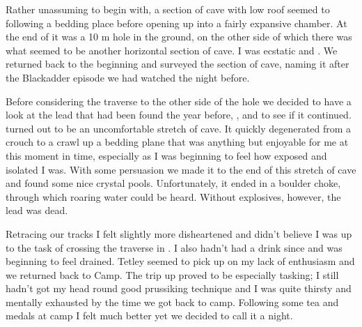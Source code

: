 
Rather unassuming to begin with, a section of cave with low roof seemed
to following a bedding place before opening up into a fairly expansive
chamber. At the end of it was a 10 m hole in the ground, on the other
side of which there was what seemed to be another horizontal section of
cave. I was ecstatic and . We returned
back to the beginning and surveyed the section of cave, naming it  after the Blackadder episode we had watched the night
before.

Before considering the traverse to the other side of the hole we decided
to have a look at the lead that had been found the year before,
, and to see if it continued.  turned out
to be an uncomfortable stretch of cave. It quickly degenerated from a
crouch to a crawl up a bedding plane that was anything but enjoyable for
me at this moment in time, especially as I was beginning to feel how
exposed and isolated I was. With some persuasion we made it to the end
of this stretch of cave and found some nice crystal pools.
Unfortunately, it ended in a boulder choke, through which roaring water
could be heard. Without explosives, however, the lead was dead.

Retracing our tracks I felt slightly more disheartened and didn't
believe I was up to the task of crossing the traverse in . I also hadn't had a drink since  and was beginning
to feel drained. Tetley seemed to pick up on my lack of enthusiasm and
we returned back to Camp. The trip up  proved to be
especially tasking; I still hadn't got my head round good prussiking
technique and I was quite thirsty and mentally exhausted by the time we
got back to camp. Following some tea and medals at camp I felt much
better yet we decided to call it a night.



